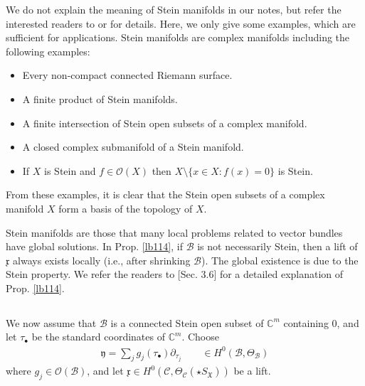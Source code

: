 \documentclass[11pt,b5paper,notitlepage]{article}
\theoremstyle{definition}
\theoremstyle{plain}
\newcommand{\fk}{\mathfrak}
\newcommand{\mc}{\mathcal}
\newcommand{\scr}{\mathscr}
\newcommand{\xk}{\mathfrak x}
\newcommand{\yk}{\mathfrak y}
\newcommand{\SX}{{S_{\fk X}}}
\newcommand{\blt}{\bullet}
\newcommand{\Cbb}{\mathbb C}
\numberwithin{equation}{section}
\begin{document}
We do not explain the meaning of Stein manifolds in our notes, but refer the interested readers to \cite[Sec. I.4]{GR-a} or \cite[Sec. III.3]{GR-b}  for details. Here, we only give some examples, which are sufficient for applications. Stein manifolds are complex manifolds including the following examples: 
\begin{itemize}
\item Every non-compact connected Riemann surface.
\item A finite product of Stein manifolds.
\item A finite intersection of Stein open subsets of a complex manifold.
\item A closed complex submanifold of a Stein manifold.
\item If $X$ is Stein and $f\in\scr O(X)$ then $X\setminus\{x\in X:f(x)=0\}$ is Stein.
\end{itemize}
From these examples, it is clear that the Stein open subsets of a  complex manifold $X$ form a basis of the topology of $X$.

Stein manifolds are those that many local problems related to vector bundles have global solutions. In Prop. \ref{lb114}, if $\mc B$ is not necessarily Stein, then a lift of $\xk$ always exists locally (i.e., after shrinking $\mc B$). The global existence is due to the Stein property. We refer the readers to \cite{Gui}[Sec. 3.6] for a detailed explanation of Prop. \ref{lb114}.




\subsection{}\label{lb126}


We now assume that $\mc B$ is a connected Stein open subset of $\Cbb^m$ containing $0$, and let $\tau_\blt$ be the standard coordinates of $\Cbb^m$. Choose
\begin{align}
\yk=\sum_j g_j(\tau_\blt)\partial_{\tau_j}\qquad \in H^0(\mc B,\Theta_{\mc B})\label{eq215}
\end{align}
where $g_j\in\scr O(\mc B)$, and let $\xk\in H^0(\mc C,\Theta_{\mc C}(\star\SX))$ be a lift. 
\end{document}
